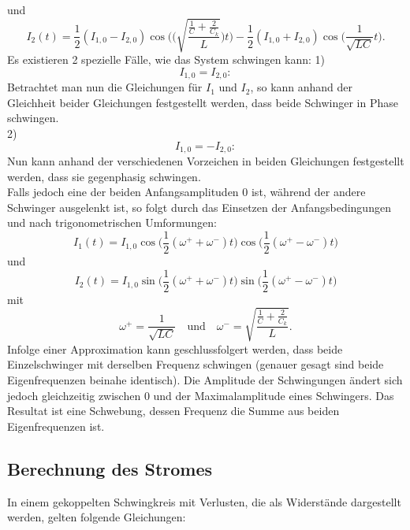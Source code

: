 und
\begin{equation}
    I_2(t) = \frac{1}{2}(I_{1,0}-I_{2,0})\cos\Biggl(\Biggl(\sqrt{\frac{\frac{1}{C}+\frac{2}{C_k}}{L}}\Biggr)t\Biggr)-\frac{1}{2}(I_{1,0}+I_{2,0})\cos\Biggl(\frac{1}{\sqrt{LC}}t\Biggr).
\end{equation}
Es existieren 2 spezielle Fälle, wie das System schwingen kann:
1)
\begin{equation}
    I_{1,0}=I_{2,0}:
\end{equation}
Betrachtet man nun die Gleichungen für \(I_1\) und \(I_2\), so kann anhand der Gleichheit beider Gleichungen festgestellt werden, dass beide Schwinger in Phase schwingen.
\\
2)
\begin{equation}
    I_{1,0}=-I_{2,0}:
\end{equation}
Nun kann anhand der verschiedenen Vorzeichen in beiden Gleichungen festgestellt werden, dass sie gegenphasig schwingen.
\\
Falls jedoch eine der beiden Anfangsamplituden 0 ist, während der andere Schwinger ausgelenkt ist, so folgt durch das Einsetzen der Anfangsbedingungen und nach trigonometrischen Umformungen:
\begin{equation}
    I_1(t)=I_{1,0}\cos\Biggl(\frac{1}{2}(\omega^{+}+\omega^{-})t\Biggr)\cos\Biggl(\frac{1}{2}(\omega^{+}-\omega^{-})t\Biggr)
\end{equation}
und
\begin{equation}
    I_2(t)=I_{1,0}\sin\Biggl(\frac{1}{2}(\omega^{+}+\omega^{-})t\Biggr)\sin\Biggl(\frac{1}{2}(\omega^{+}-\omega^{-})t\Biggr)
\end{equation}
mit
\begin{equation}
    \omega^{+}=\frac{1}{\sqrt{LC}} \quad\textrm{und}\quad \omega^{-}=\sqrt{\frac{\frac{1}{C}+\frac{2}{C_k}}{L}}.
\end{equation}
Infolge einer Approximation kann geschlussfolgert werden, dass beide Einzelschwinger mit derselben Frequenz schwingen (genauer gesagt sind beide Eigenfrequenzen beinahe identisch). Die Amplitude der Schwingungen ändert sich jedoch gleichzeitig zwischen 0 und der Maximalamplitude eines Schwingers. Das Resultat ist eine Schwebung, dessen Frequenz die Summe aus beiden Eigenfrequenzen ist.

\subsection{Berechnung des Stromes}

In einem gekoppelten Schwingkreis mit Verlusten, die als Widerstände dargestellt werden, gelten folgende Gleichungen:

